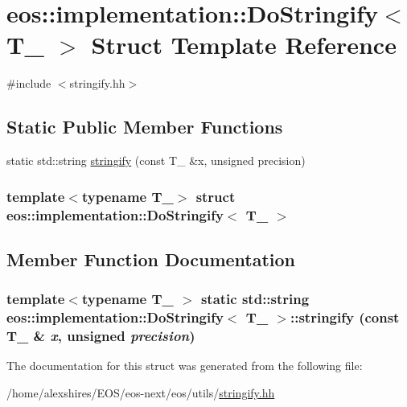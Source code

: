 \hypertarget{structeos_1_1implementation_1_1DoStringify}{
\section{eos::implementation::DoStringify$<$ T\_\- $>$ Struct Template Reference}
\label{structeos_1_1implementation_1_1DoStringify}
}


{\ttfamily \#include $<$stringify.hh$>$}\subsection*{Static Public Member Functions}
\begin{DoxyCompactItemize}
\item 
static std::string \hyperlink{structeos_1_1implementation_1_1DoStringify_ad66f86c95141a3322aca8f1be1030608}{stringify} (const T\_\- \&x, unsigned precision)
\end{DoxyCompactItemize}
\subsubsection*{template$<$typename T\_\-$>$ struct eos::implementation::DoStringify$<$ T\_\- $>$}



\subsection{Member Function Documentation}
\hypertarget{structeos_1_1implementation_1_1DoStringify_ad66f86c95141a3322aca8f1be1030608}{
\subsubsection[{stringify}]{\setlength{\rightskip}{0pt plus 5cm}template$<$typename T\_\- $>$ static std::string {\bf eos::implementation::DoStringify}$<$ T\_\- $>$::stringify (const T\_\- \& {\em x}, \/  unsigned {\em precision})}}
\label{structeos_1_1implementation_1_1DoStringify_ad66f86c95141a3322aca8f1be1030608}


The documentation for this struct was generated from the following file:\begin{DoxyCompactItemize}
\item 
/home/alexshires/EOS/eos-\/next/eos/utils/\hyperlink{stringify_8hh}{stringify.hh}\end{DoxyCompactItemize}
